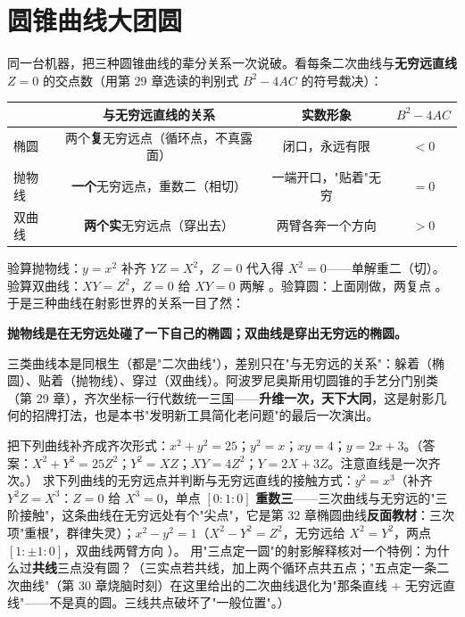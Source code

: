 \section{圆锥曲线大团圆}

同一台机器，把三种圆锥曲线的辈分关系一次说破。看每条二次曲线与\textbf{无穷远直线} $Z=0$ 的交点数（用第 29 章选读的判别式 $B^2 - 4AC$ 的符号裁决）：

\begin{center}
\begin{tabular}{lccc}
\toprule
 & 与无穷远直线的关系 & 实数形象 & $B^2-4AC$ \\
\midrule
椭圆 & 两个\textbf{复}无穷远点（循环点，不真露面） & 闭口，永远有限 & $<0$ \\
抛物线 & \textbf{一个}无穷远点，重数二（相切） & 一端开口，"贴着"无穷 & $=0$ \\
双曲线 & \textbf{两个实}无穷远点（穿出去） & 两臂各奔一个方向 & $>0$ \\
\bottomrule
\end{tabular}
\end{center}

验算抛物线：$y = x^2$ 补齐 $YZ = X^2$，$Z = 0$ 代入得 $X^2 = 0$——单解重二（切）\checkmark。验算双曲线：$XY = Z^2$，$Z=0$ 给 $XY = 0$ 两解 \checkmark。验算圆：上面刚做，两复点 \checkmark。于是三种曲线在射影世界的关系一目了然：

\begin{jielun}
\textbf{抛物线是在无穷远处碰了一下自己的椭圆；双曲线是穿出无穷远的椭圆。}
\end{jielun}

三类曲线本是同根生（都是"二次曲线"），差别只在"与无穷远的关系"：躲着（椭圆）、贴着（抛物线）、穿过（双曲线）。阿波罗尼奥斯用切圆锥的手艺分门别类（第 29 章），齐次坐标一行代数统一三国——\textbf{升维一次，天下大同}，这是射影几何的招牌打法，也是本书"发明新工具简化老问题"的最后一次演出。

\begin{dongshou}
\begin{itemize}
  \yisi 把下列曲线补齐成齐次形式：$x^2 + y^2 = 25$；$y^2 = x$；$xy = 4$；$y = 2x + 3$。（答案：$X^2+Y^2 = 25Z^2$；$Y^2 = XZ$；$XY = 4Z^2$；$Y = 2X + 3Z$。注意直线是一次齐次。）
  \yier 求下列曲线的无穷远点并判断与无穷远直线的接触方式：$y^2 = x^3$（补齐 $Y^2Z = X^3$：$Z=0$ 给 $X^3 = 0$，单点 $[0:1:0]$ \textbf{重数三}——三次曲线与无穷远的"三阶接触"，这条曲线在无穷远处有个"尖点"，它是第 32 章椭圆曲线\textbf{反面教材}：三次项"重根"，群律失灵）；$x^2 - y^2 = 1$（$X^2 - Y^2 = Z^2$，无穷远给 $X^2 = Y^2$，两点 $[1:\pm1:0]$，双曲线两臂方向 \checkmark）。
  \yier 用"三点定一圆"的射影解释核对一个特例：为什么过\textbf{共线}三点没有圆？（三实点若共线，加上两个循环点共五点；"五点定一条二次曲线"（第 30 章烧脑时刻）在这里给出的二次曲线退化为"那条直线 $+$ 无穷远直线"——不是真的圆。三线共点破坏了"一般位置"。）
\end{itemize}
\end{dongshou}

